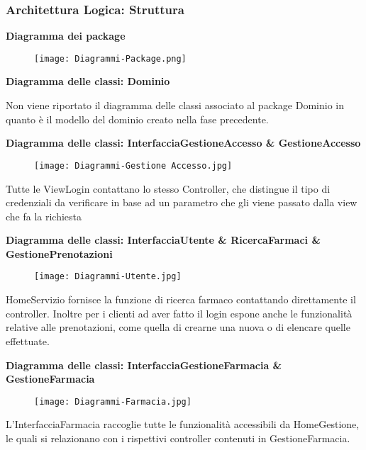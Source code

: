 \newpage
\subsubsection{Architettura Logica: Struttura}
\hfill \break

\textbf{Diagramma dei package}
\hfill \break

\begin{figure}[h!]
    \begin{center}
        \texttt{[image: Diagrammi-Package.png]}
    \end{center}
\end{figure}
\hfill \break

\textbf{Diagramma delle classi: Dominio}
\hfill \break

Non viene riportato il diagramma delle classi associato al package Dominio in quanto è il modello del dominio creato nella fase precedente.

\newpage

\textbf{Diagramma delle classi: InterfacciaGestioneAccesso \& GestioneAccesso}
\hfill \break

\begin{figure}[h!]
    \begin{center}
        \texttt{[image: Diagrammi-Gestione Accesso.jpg]}
    \end{center}
\end{figure}
Tutte le ViewLogin contattano lo stesso Controller, che distingue il tipo di
credenziali da verificare in base ad un parametro che gli viene passato dalla
view che fa la richiesta
\hfill \break

\textbf{Diagramma delle classi: InterfacciaUtente \& RicercaFarmaci \& GestionePrenotazioni }

\begin{figure}[h!]
    \begin{center}
        \texttt{[image: Diagrammi-Utente.jpg]}
    \end{center}
\end{figure}
HomeServizio fornisce la funzione di ricerca farmaco contattando direttamente
il controller. Inoltre per i clienti ad aver fatto il login espone anche le
funzionalità relative alle prenotazioni, come quella di crearne una nuova o di
elencare quelle effettuate.

\newpage
\textbf{Diagramma delle classi: InterfacciaGestioneFarmacia \& GestioneFarmacia}
\hfill \break

\begin{figure}[h!]
    \begin{center}
        \texttt{[image: Diagrammi-Farmacia.jpg]}
    \end{center}
\end{figure}
L'InterfacciaFarmacia raccoglie tutte le funzionalità accessibili da
HomeGestione, le quali si relazionano con i rispettivi controller contenuti in
GestioneFarmacia.

